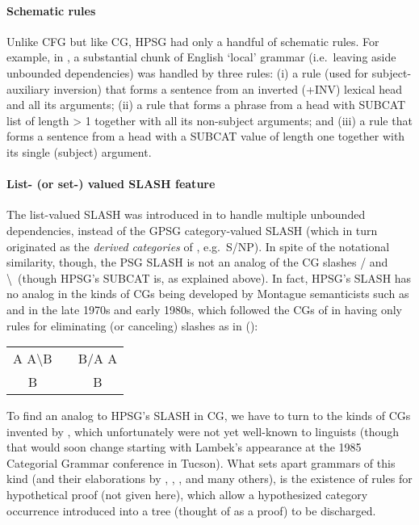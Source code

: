 \documentclass[output=paper]{langsci/langscibook}
\begin{document}
\paragraph*{Schematic rules} Unlike CFG but like CG, HPSG had only a handful of schematic rules. For example, in \citet{Pollard85a-u}, a substantial chunk of English `local' grammar (i.e.~leaving aside unbounded dependencies) was handled by three rules: (i) a rule (used for subject-auxiliary inversion) that forms a sentence from an inverted (+INV) lexical head and all its arguments; (ii) a rule that forms a phrase from a head with SUBCAT list of length > 1 together with all its non-subject arguments; and (iii) a rule that forms a sentence from a head with a SUBCAT value of length one together with its single (subject) argument.

\paragraph*{List- (or set-) valued SLASH feature} The list-valued SLASH was introduced in \citet{Pollard85a-u} to handle multiple unbounded dependencies, instead of the GPSG category-valued SLASH (which in turn originated as the \emph{derived categories} of  \citet{Gazdar81}, e.g.~S/NP). In spite of the notational similarity, though, the PSG SLASH is not an analog of the CG slashes / and \textbackslash \ (though HPSG's SUBCAT is, as explained above). In fact, HPSG's SLASH has no analog in the kinds of CGs being developed by Montague semanticists such as \citet{Bach79a,Bach80a} and \citet{Dowty82a-u} in the late 1970s and early 1980s, which followed the CGs of \citet{Bar-Hillel54-u} in having only rules for eliminating (or canceling) slashes as in ():

\ea
\begin{tabular}[t]{ccc}
A A{\textbackslash}B  & &     B/A A \\ \cline{1-1} \cline{3-3}
B & & B 
\end{tabular}
\z

\noindent
To find an analog to HPSG's SLASH in CG, we have to turn to the kinds of CGs invented by \citet{Lambek1958}, which unfortunately were not yet well-known to linguists (though that would soon change starting with Lambek's appearance at the 1985 Categorial Grammar conference in Tucson). What sets apart grammars 
of this kind (and their elaborations by \citet{Moortgat89a-u}, \citet{OBW88a-ed}, \citet{Morrill94a-u}, and many others), is the existence of rules for hypothetical proof (not given here), which allow a hypothesized category occurrence introduced into a tree (thought of as a proof) to be discharged. 
\end{document}
